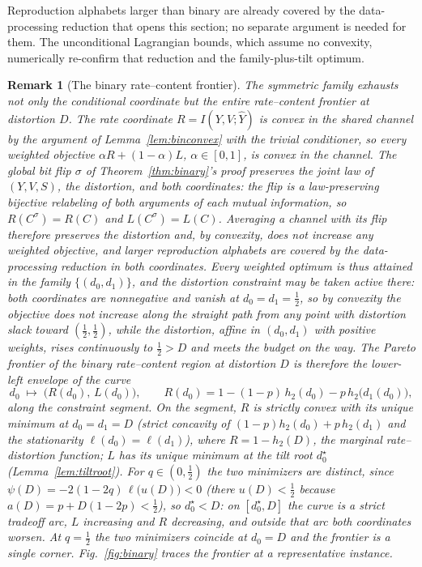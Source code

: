 ﻿\documentclass[11pt,onecolumn]{IEEEtran}
\newtheorem{remark}[theorem]{Remark}
\newcommand{\hY}{\widehat{Y}}
\begin{document}
Reproduction alphabets larger than binary are already covered by the
data-processing reduction that opens this section; no separate argument
is needed for them. The unconditional Lagrangian bounds, which assume no
convexity, numerically re-confirm that reduction and the
family-plus-tilt optimum.

\begin{remark}[The binary rate--content frontier]\label{rem:binfrontier}
The symmetric family exhausts not only the conditional coordinate but
the entire rate--content frontier at distortion $D$. The rate
coordinate $R=I(Y,V;\hY)$ is convex in the shared channel by the
argument of Lemma~\ref{lem:binconvex} with the trivial conditioner, so
every weighted objective $\alpha R+(1-\alpha)L$, $\alpha\in[0,1]$, is
convex in the channel. The global bit flip $\sigma$ of
Theorem~\ref{thm:binary}'s proof preserves the joint law of $(Y,V,S)$,
the distortion, and both coordinates: the flip is a law-preserving
bijective relabeling of both arguments of each mutual information, so
$R(C^\sigma)=R(C)$ and $L(C^\sigma)=L(C)$. Averaging a channel with its
flip therefore preserves the distortion and, by convexity, does not
increase any weighted objective, and larger reproduction alphabets are
covered by the data-processing reduction in both coordinates. Every
weighted optimum is thus attained in the family $\{(d_0,d_1)\}$, and
the distortion constraint may be taken active there: both coordinates
are nonnegative and vanish at $d_0=d_1=\tfrac12$, so by convexity the
objective does not increase along the straight path from any point
with distortion slack toward $(\tfrac12,\tfrac12)$, while the
distortion, affine in $(d_0,d_1)$ with positive weights, rises
continuously to $\tfrac12>D$ and meets the budget on the way. The
Pareto frontier of the binary rate--content region at distortion
$D$ is therefore the lower-left envelope of the curve
\[
d_0\;\longmapsto\;\bigl(R(d_0),\,L(d_0)\bigr),
\qquad
R(d_0)=1-(1-p)\,h_2(d_0)-p\,h_2\bigl(d_1(d_0)\bigr),
\]
along the constraint segment. On the segment, $R$ is strictly convex
with its unique minimum at $d_0=d_1=D$ (strict concavity of
$(1-p)h_2(d_0)+p\,h_2(d_1)$ and the stationarity
$\ell(d_0)=\ell(d_1)$), where $R=1-h_2(D)$, the marginal
rate--distortion function; $L$ has its unique minimum at the tilt root
$d_0^\star$ (Lemma~\ref{lem:tiltroot}). For $q\in(0,\tfrac12)$ the two
minimizers are distinct, since
$\psi(D)=-2(1-2q)\,\ell\bigl(u(D)\bigr)<0$ (there $u(D)<\tfrac12$
because $a(D)=p+D(1-2p)<\tfrac12$), so $d_0^\star<D$: on
$[d_0^\star,D]$ the curve is a strict tradeoff arc, $L$ increasing and
$R$ decreasing, and outside that arc both coordinates worsen. At
$q=\tfrac12$ the two minimizers coincide at $d_0=D$ and the frontier
is a single corner. Fig.~\ref{fig:binary} traces the frontier at a
representative instance.
\end{remark}
\end{document}
